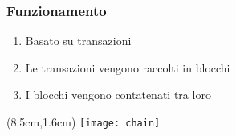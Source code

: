 \begin{frame}
  \frametitle{Funzionamento}
  
  \begin{enumerate}
   \item<1-> Basato su transazioni
   \item<2-> Le transazioni vengono raccolti in blocchi
   \item<3-> I blocchi vengono contatenati tra loro
  \end{enumerate}


 \begin{textblock*}{5cm}(8.5cm,1.6cm)
  \texttt{[image: chain]}
 \end{textblock*}
  
\end{frame}